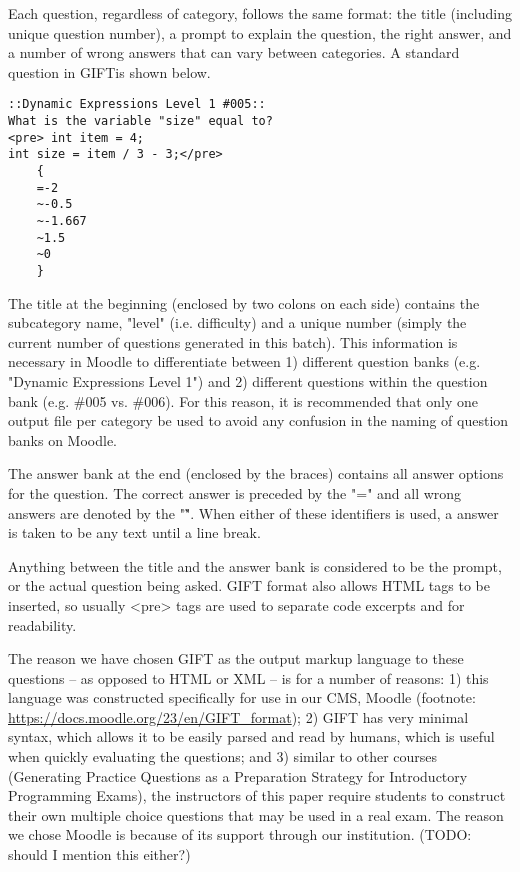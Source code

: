 \documentclass{article}
\begin{document}
Each question, regardless of category, follows the same format: the title (including unique question number),
a prompt to explain the question, the right answer, and a number of wrong answers that can vary between categories.
A standard question in GIFTis shown below.

\begin{Verbatim}[tabsize=4]
::Dynamic Expressions Level 1 #005::
What is the variable "size" equal to?
<pre> int item = 4; 
int size = item / 3 - 3;</pre>
	{ 
	=-2 
	~-0.5 
	~-1.667 
	~1.5 
	~0 
	}
\end{Verbatim}

The title at the beginning (enclosed by two colons on each side) contains the subcategory name, "level" (i.e. difficulty) and a unique number (simply the current number
of questions generated in this batch). This information is necessary in Moodle to differentiate between 1) different question banks (e.g. "Dynamic Expressions Level 1") and
2) different questions within the question bank (e.g. \#005 vs. \#006). For this reason, it is recommended that only one output file per category be used to avoid any confusion
in the naming of question banks on Moodle.

The answer bank at the end (enclosed by the braces) contains all answer options for the question. The correct answer is preceded by the "=" and all wrong answers are denoted by
the "\~". When either of these identifiers is used, a answer is taken to be any text until a line break.

Anything between the title and the answer bank is
considered to be the prompt, or the actual question being asked. GIFT format also allows HTML tags to be inserted,
so usually <pre> tags are used to separate code excerpts and for readability.

The reason we have chosen GIFT as the output markup language to these questions -- as opposed to HTML or XML -- is for a number of reasons: 1) this language was constructed specifically for use in our CMS, Moodle (footnote: \url{https://docs.moodle.org/23/en/GIFT_format}); 2) GIFT has very minimal syntax, which allows it to be easily parsed and read by humans, which is useful when quickly evaluating the questions; and 3) similar to other courses (Generating Practice Questions as a Preparation Strategy
for Introductory Programming Exams), the instructors of this paper require students to construct their own multiple choice questions that may be used in a real exam. The reason we chose Moodle is because of its support through our institution. (TODO: should I mention this either?)
\end{document}
